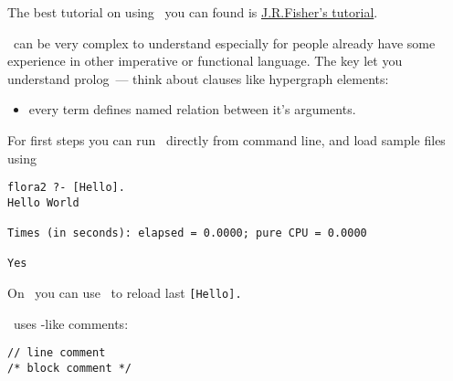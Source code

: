 \secdown

The best tutorial on using \prolog\ you can found is
\href{https://www.cpp.edu/~jrfisher/www/prolog_tutorial/contents.html}{J.R.Fisher's
tutorial}.

\bigskip
\prolog\ can be very complex to understand especially for people already have
some experience in other imperative or functional language. The key let you
understand prolog\ --- think about clauses like hypergraph elements:
\begin{itemize}
  \item 
every term defines named relation between it's arguments.
\end{itemize}

\clearpage
For first steps you can run \flora\ directly from command line, and load sample
files using



\begin{verbatim}
flora2 ?- [Hello].
Hello World

Times (in seconds): elapsed = 0.0000; pure CPU = 0.0000

Yes
\end{verbatim}

On \win\ you can use \keys{\arrowkeyup}\ to reload last \verb$[Hello].$


\flora\ uses \cpp-like comments:
\begin{verbatim}
// line comment
/* block comment */
\end{verbatim}

\secup
